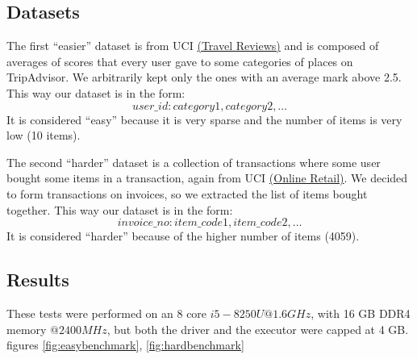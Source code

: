 \documentclass[a4paper]{article}
\begin{document}
	\subsection{Datasets}
	The first ``easier'' dataset is from UCI \href{https://archive.ics.uci.edu/ml/datasets/Travel+Reviews#}{(Travel Reviews)} and is composed of averages of scores that every user gave to some
	categories of places on TripAdvisor. We arbitrarily kept only the ones with an average mark above 2.5.\\
	This way our dataset is in the form:
	\[ user\_id: category1, category2, \ldots \]
	It is considered ``easy'' because it is very sparse and the number of items is very low (10 items).

	The second ``harder'' dataset is a collection of transactions where some user bought some items in a transaction, again from UCI \href{https://archive.ics.uci.edu/ml/datasets/online+retail}{(Online Retail)}.
	We decided to form transactions on invoices, so we extracted the list of items bought together.
	This way our dataset is in the form:
	\[ invoice\_no: item\_code1, item\_code2, \ldots \]
	It is considered ``harder'' because of the higher number of items (4059).

	\subsection{Results}
	These tests were performed on an 8 core $i5-8250U @1.6GHz$, with 16 GB DDR4 memory $@2400MHz$, but both the driver and the executor were capped at 4 GB.
	figures \ref{fig:easybenchmark}, \ref{fig:hardbenchmark}
\end{document}
